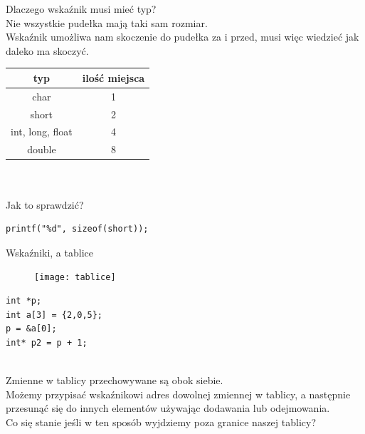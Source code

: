 \documentclass[notheorems, aspectratio=54]{beamer}
\begin{document}
\begin{frame}[fragile]
Dlaczego wskaźnik musi mieć typ?\\
Nie wszystkie pudełka mają taki sam rozmiar.\\
Wskaźnik umożliwa nam skoczenie do pudełka za i przed, musi więc wiedzieć jak daleko ma skoczyć.
\begin{center}
\begin{tabular}{ |c |c | }
 \hline
 typ & ilość miejsca \\ 
\hline
 char & 1 \\ 
 short & 2 \\  
 int, long, float & 4 \\
 double & 8  \\
\hline
\end{tabular}
~\\~\\
\flushleft
Jak to sprawdzić?
\begin{lstlisting}
printf("%d", sizeof(short));
\end{lstlisting}

\end{center}

\end{frame}

\begin{frame}[fragile]
Wskaźniki, a tablice
\center
\begin{table}[!htb]
\begin{minipage}{.5\linewidth}
\begin{figure}

  \texttt{[image: tablice]}
\end{figure}
\end{minipage}%
\begin{minipage}{.5\linewidth}

\begin{lstlisting}
int *p;
int a[3] = {2,0,5};
p = &a[0];
int* p2 = p + 1;
\end{lstlisting}
~\\
Zmienne w tablicy przechowywane są obok siebie.\\
Możemy przypisać wskaźnikowi adres dowolnej zmiennej w tablicy, a następnie przesunąć się do innych elementów używając dodawania lub odejmowania.\\
Co się stanie jeśli w ten sposób wyjdziemy poza granice naszej tablicy?\\
\end{minipage} 
\end{table}
\end{frame}
\end{document}
